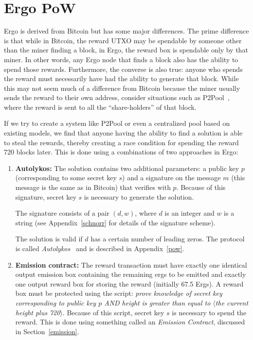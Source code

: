 \documentclass[runningheads]{llncs}
\newcommand{\powname}{Autolykos\xspace}
\begin{document}
\section{Ergo PoW}

Ergo is derived from Bitcoin but has some major differences. The prime difference is that while in Bitcoin, the reward UTXO may be spendable by someone other than the miner finding a block, in Ergo, the reward box is spendable only by that miner. In other words, any Ergo node that finds a block also has the ability to spend those rewards. Furthermore, the converse is also true: anyone who spends the reward must necessarily have had the ability to generate that block. While this may not seem much of a difference from Bitcoin because the miner usually sends the reward to their own address, consider situations such as P2Pool~\cite{p2pool}, where the reward is sent to all the ``share-holders'' of that block. 

If we try to create a system like P2Pool or even a centralized pool based on existing models, we find that anyone having the ability to find a solution is able to steal the rewards, thereby creating a race condition for spending the reward 720 blocks later. This is done using a combinations of two approaches in Ergo:
\begin{enumerate}
	\item \textbf{\powname:} The solution contains two additional parameters: a public key $p$ (corresponding to some secret key $s$) and a signature on the message $m$ (this message is the same as in Bitcoin) that verifies with $p$. Because of this signature, secret key $s$ is necessary to generate the solution. 

	The signature consists of a pair $(d, w)$, where $d$ is an integer and $w$ is a string (see Appendix~\ref{schnorr} for details of the signature scheme). 

	The solution is valid if $d$ has a certain number of leading zeros. 
	The protocol is called {\em \powname}~\cite{autolykos} and is described in Appendix~\ref{pow}.
	\item \textbf{Emission contract:} The reward transaction must have exactly one identical output emission box containing the remaining ergs to be emitted and exactly one output reward box for storing the reward (initially 67.5 Ergs). A reward box must be protected using the script: {\em prove knowledge of secret key corresponding to public key $p$ AND height is greater than equal to $\langle$the current height plus 720$\rangle$}. Because of this script, secret key $s$ is necessary to spend the reward. This is done using something called an {\em Emission Contract}, discussed in Section~\ref{emission}.
\end{enumerate} 
\end{document}
